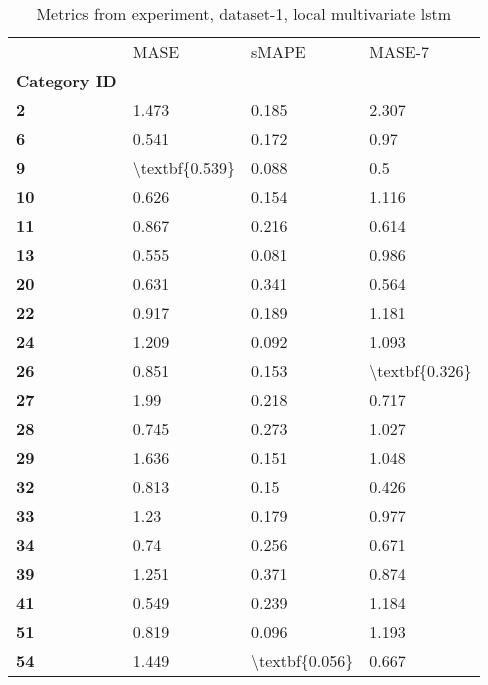 \begin{table}[h]
\centering
\caption{Metrics from experiment, dataset-1, local multivariate lstm}
\label{table:local-multivariate-lstm-dataset-1}
\begin{tabular}{llll}
\toprule
{} &            MASE &           sMAPE &          MASE-7 \\
\textbf{Category ID} &                 &                 &                 \\
\midrule
\textbf{2          } &           1.473 &           0.185 &           2.307 \\
\textbf{6          } &           0.541 &           0.172 &            0.97 \\
\textbf{9          } &  \textbackslash textbf\{0.539\} &           0.088 &             0.5 \\
\textbf{10         } &           0.626 &           0.154 &           1.116 \\
\textbf{11         } &           0.867 &           0.216 &           0.614 \\
\textbf{13         } &           0.555 &           0.081 &           0.986 \\
\textbf{20         } &           0.631 &           0.341 &           0.564 \\
\textbf{22         } &           0.917 &           0.189 &           1.181 \\
\textbf{24         } &           1.209 &           0.092 &           1.093 \\
\textbf{26         } &           0.851 &           0.153 &  \textbackslash textbf\{0.326\} \\
\textbf{27         } &            1.99 &           0.218 &           0.717 \\
\textbf{28         } &           0.745 &           0.273 &           1.027 \\
\textbf{29         } &           1.636 &           0.151 &           1.048 \\
\textbf{32         } &           0.813 &            0.15 &           0.426 \\
\textbf{33         } &            1.23 &           0.179 &           0.977 \\
\textbf{34         } &            0.74 &           0.256 &           0.671 \\
\textbf{39         } &           1.251 &           0.371 &           0.874 \\
\textbf{41         } &           0.549 &           0.239 &           1.184 \\
\textbf{51         } &           0.819 &           0.096 &           1.193 \\
\textbf{54         } &           1.449 &  \textbackslash textbf\{0.056\} &           0.667 \\
\bottomrule
\end{tabular}
\end{table}
